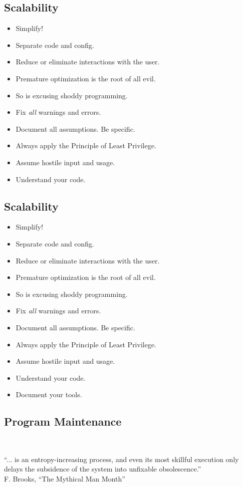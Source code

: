 \documentclass[xga]{xdvislides}
\begin{document}
\subsection{Scalability}
\begin{itemize}
	\item Simplify!
	\item Separate code and config.
	\item Reduce or eliminate interactions with the user.
	\item Premature optimization is the root of all evil.
	\item So is excusing shoddy programming.
	\item Fix {\em all} warnings and errors.
	\item Document all assumptions.  Be specific.
	\item Always apply the Principle of Least Privilege.
	\item Assume hostile input and usage.
	\item Understand your code.
\end{itemize}

\subsection{Scalability}
\begin{itemize}
	\item Simplify!
	\item Separate code and config.
	\item Reduce or eliminate interactions with the user.
	\item Premature optimization is the root of all evil.
	\item So is excusing shoddy programming.
	\item Fix {\em all} warnings and errors.
	\item Document all assumptions.  Be specific.
	\item Always apply the Principle of Least Privilege.
	\item Assume hostile input and usage.
	\item Understand your code.
	\item Document your tools.
\end{itemize}


\subsection{Program Maintenance}
\\
\Huge
\begin{center}
	``... is an entropy-increasing process, and even its most skillful
	execution only delays the subsidence of the system into unfixable
	obsolescence.'' \\
	\addvspace{.2in}
	\small F. Brooks, ``The Mythical Man Month''
\end{center}
\Normalsize
\end{document}
